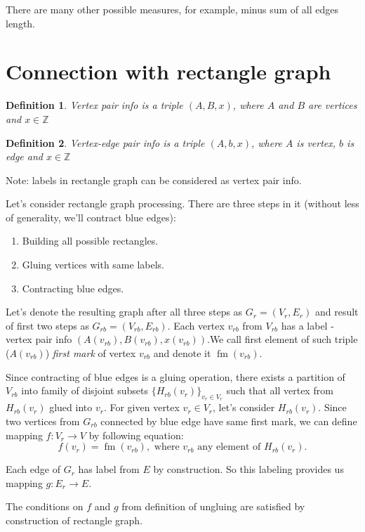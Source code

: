 \documentclass[12pt,a4paper,oneside]{article}
\newtheorem{definition}{Definition}
\begin{document}
There are many other possible measures, for example, minus sum of all edges length.

\section{Connection with rectangle graph}

\begin{definition}
  \emph{Vertex pair info} is a triple $(A, B, x)$, where $A$ and $B$ are vertices and $x \in \mathbb{Z}$ 
\end{definition}
\begin{definition}
  \emph{Vertex-edge pair info} is a triple $(A, b, x)$, where $A$ is vertex, $b$ is edge and $x \in \mathbb{Z}$ 
\end{definition}
Note: labels in rectangle graph can be considered as vertex pair info.

Let's consider rectangle graph processing. 
There are three steps in it (without less of generality, we'll contract blue edges):
\begin{enumerate}
\item Building all possible rectangles.
\item Gluing vertices with same labels.
\item Contracting blue edges.
\end{enumerate}
Let's denote the resulting graph after all three steps as $G_r = (V_r,E_r)$ and result of first two steps as $G_{rb} = (V_{rb}, E_{rb})$. Each vertex $v_{rb}$ from $V_{rb}$ has a label - vertex pair info $(A(v_{rb}), B(v_{rb}), x(v_{rb}))$.We call first element of such triple ($A(v_{rb})$) \emph{first mark} of vertex $v_{rb}$ and denote it $\mathop{fm}(v_{rb})$. 

Since contracting of blue edges is a gluing operation, there exists a partition of $V_{rb}$ into family of disjoint subsets $\{H_{rb}(v_r)\}_{v_r\in V_r}$ such that all vertex from $H_{rb}(v_r)$ glued into $v_r$. 
For given vertex $v_r \in V_r$, let's consider $H_{rb}(v_r)$. Since two vertices from $G_{rb}$ connected by blue edge have same first mark, we can define mapping $f: V_r\rightarrow V$ by following equation:
$$f(v_r)=\mathop{fm}(v_{rb}), \text{ where }v_{rb}\text{ any element of } H_{rb}(v_r).$$

Each edge of $G_{r}$ has label from $E$ by construction. So this labeling provides us mapping $g:E_{r}\rightarrow E$. 

The conditions on $f$ and $g$ from definition of ungluing are satisfied by construction of rectangle graph.
\end{document}

